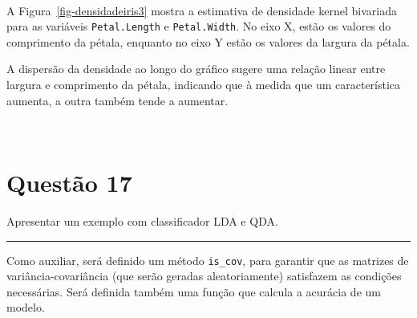 \documentclass[
  a4paperpaper,
]{article}
\begin{document}
~

A Figura~\ref{fig-densidadeiris3} mostra a estimativa de densidade
kernel bivariada para as variáveis \texttt{Petal.Length} e
\texttt{Petal.Width}. No eixo X, estão os valores do comprimento da
pétala, enquanto no eixo Y estão os valores da largura da pétala.

A dispersão da densidade ao longo do gráfico sugere uma relação linear
entre largura e comprimento da pétala, indicando que à medida que um
característica aumenta, a outra também tende a aumentar.

~

\section{Questão 17}\label{questuxe3o-17}

Apresentar um exemplo com classificador LDA e QDA.

\begin{center}\rule{0.5\linewidth}{0.5pt}\end{center}

Como auxiliar, será definido um método \texttt{is\_cov}, para garantir
que as matrizes de variância-covariância (que serão geradas
aleatoriamente) satisfazem as condições necessárias. Será definida
também uma função que calcula a acurácia de um modelo.
\end{document}
